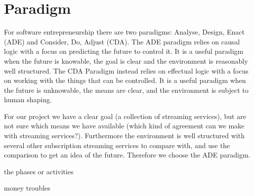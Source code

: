\section{Paradigm}
For software entrepreneurship there are two paradigms: Analyse, Design, Enact (ADE) and Consider, Do, Adjust (CDA).
The ADE paradigm relies on causal logic with a focus on predicting the future to control it.
It is a useful paradigm when the future is knowable, the goal is clear and the environment is reasonably well structured.
The CDA Paradigm instead relies on effectual logic with a focus on working with the things that can be controlled.
It is a useful paradigm when the future is unknowable, the means are clear, and the environment is subject to human shaping.

For our project we have a clear goal (a collection of streaming services), but are not sure which means we have available (which kind of agreement can we make with streaming services?).
Furthermore the environment is well structured with several other subscription streaming services to compare with, and use the comparison to get an idea of the future.
Therefore we choose the ADE paradigm.

the phases or activities

money troubles